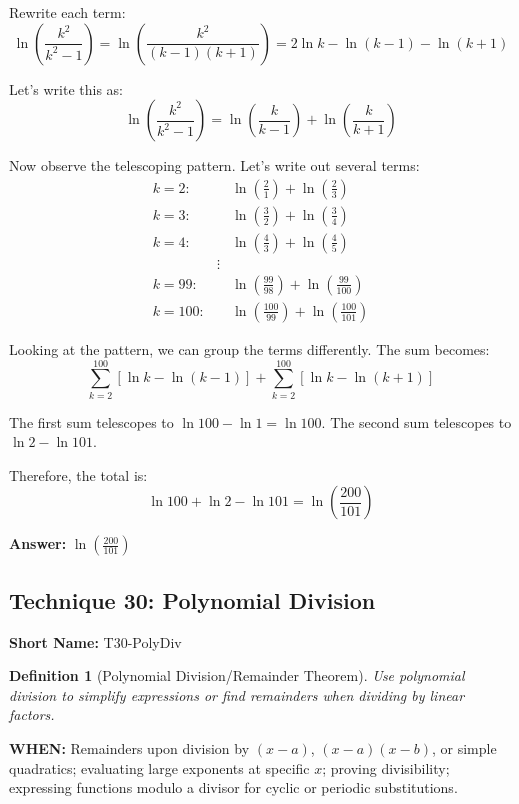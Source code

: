 \documentclass[12pt]{article}
\newtheorem{definition}{Definition}[section]
\newenvironment{solution}
{\begin{tcolorbox}[colback=green!5!white,colframe=green!75!black,title={Solution}]}{\end{tcolorbox}}
\begin{document}
\begin{solution}
Rewrite each term:
$$\ln\left(\frac{k^2}{k^2-1}\right) = \ln\left(\frac{k^2}{(k-1)(k+1)}\right) = 2\ln k - \ln(k-1) - \ln(k+1)$$

Let's write this as:
$$\ln\left(\frac{k^2}{k^2-1}\right) = \ln\left(\frac{k}{k-1}\right) + \ln\left(\frac{k}{k+1}\right)$$

Now observe the telescoping pattern. Let's write out several terms:
\begin{align}
k=2: &\quad \ln\left(\frac{2}{1}\right) + \ln\left(\frac{2}{3}\right)\\
k=3: &\quad \ln\left(\frac{3}{2}\right) + \ln\left(\frac{3}{4}\right)\\
k=4: &\quad \ln\left(\frac{4}{3}\right) + \ln\left(\frac{4}{5}\right)\\
&\vdots\\
k=99: &\quad \ln\left(\frac{99}{98}\right) + \ln\left(\frac{99}{100}\right)\\
k=100: &\quad \ln\left(\frac{100}{99}\right) + \ln\left(\frac{100}{101}\right)
\end{align}

Looking at the pattern, we can group the terms differently. The sum becomes:
$$\sum_{k=2}^{100} \left[\ln k - \ln(k-1)\right] + \sum_{k=2}^{100} \left[\ln k - \ln(k+1)\right]$$

The first sum telescopes to $\ln 100 - \ln 1 = \ln 100$.
The second sum telescopes to $\ln 2 - \ln 101$.

Therefore, the total is:
$$\ln 100 + \ln 2 - \ln 101 = \ln\left(\frac{200}{101}\right)$$

\textbf{Answer:} $\ln\left(\frac{200}{101}\right)$
\end{solution}

\subsection{Technique 30: Polynomial Division}
\textbf{Short Name:} T30-PolyDiv

\begin{definition}[Polynomial Division/Remainder Theorem]
Use polynomial division to simplify expressions or find remainders when dividing by linear factors.
\end{definition}

\textbf{WHEN:} Remainders upon division by $(x-a)$, $(x-a)(x-b)$, or simple quadratics; evaluating large exponents at specific $x$; proving divisibility; expressing functions modulo a divisor for cyclic or periodic substitutions.
\end{document}
